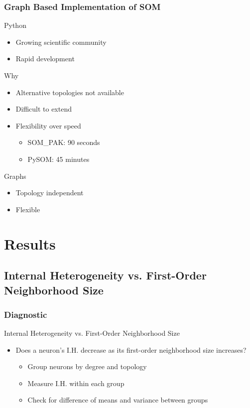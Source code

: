 \documentclass[nototal,handout]{beamer}
\begin{document}
\begin{frame}
	\frametitle{Graph Based Implementation of SOM}
 
\begin{block}{Python}
 \begin{itemize}
 \item  Growing scientific community
 \item  Rapid development
 \end{itemize}
 \end{block} 
\begin{block}{Why}
 \begin{itemize}
 \item  Alternative topologies not available 
 \item  Difficult to extend
 \item  Flexibility over speed
 \begin{itemize}
 \item  SOM\_PAK: 90 seconds
 \item  PySOM: 45 minutes
 \end{itemize}
 \end{itemize}
 \end{block} 
\begin{block}{Graphs}
 \begin{itemize}
 \item  Topology independent
 \item  Flexible
 \end{itemize}
 \end{block} \end{frame} 


\section{Results} 

\subsection{Internal Heterogeneity vs. First-Order Neighborhood Size} 

\begin{frame}
	\frametitle{Diagnostic}
 
\begin{block}{Internal Heterogeneity vs. First-Order Neighborhood Size}
 \begin{itemize}
 \item  Does a neuron's I.H. decrease as its first-order neighborhood size increases?
 \begin{itemize}
 \item  Group neurons by degree and topology
 \item  Measure I.H. within each group
 \item  Check for difference of means and variance between groups
 \end{itemize}
 \end{itemize}
 \end{block} \end{frame} 
\end{document}
